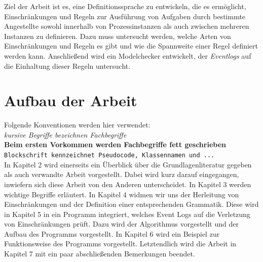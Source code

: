Ziel der Arbeit ist es, eine Definitionssprache zu entwickeln, die es ermöglicht, Einschränkungen und Regeln zur Ausführung von Aufgaben durch bestimmte Angestellte sowohl innerhalb von Prozessinstanzen als auch zwischen mehreren Instanzen zu definieren. Dazu muss untersucht werden, welche Arten von Einschränkungen und Regeln es gibt und wie die Spannweite einer Regel definiert werden kann. Anschließend wird ein Modelchecker entwickelt, der \textit{Eventlogs} auf die Einhaltung dieser Regeln untersucht.




\section{Aufbau der Arbeit}
Folgende Konventionen werden hier verwendet:\\
\textit{kursive Begriffe  bezeichnen Fachbegriffe}\\
\textbf{Beim ersten Vorkommen werden Fachbegriffe fett geschrieben}\\
\texttt{Blockschrift kennzeichnet Pseudocode, Klassennamen und ...}\\

In Kapitel 2 wird einerseits ein Überblick über die Grundlagenliteratur gegeben als auch verwandte Arbeit vorgestellt. Dabei wird kurz darauf eingegangen, inwiefern sich diese Arbeit von den Anderen unterscheidet. In Kapitel 3 werden wichtige Begriffe erläutert. In Kapitel 4 widmen wir uns der  Herleitung von Einschränkungen und der Definition einer entsprechenden Grammatik. Diese wird in Kapitel 5 in ein Programm integriert, welches Event Logs auf die Verletzung von Einschränkungen prüft. Dazu wird der Algorithmus vorgestellt und der Aufbau des Programms vorgestellt. In Kapitel 6 wird ein Beispiel zur Funktionsweise des Programms vorgestellt. Letztendlich wird die Arbeit in Kapitel 7 mit ein paar abschließenden Bemerkungen beendet.

